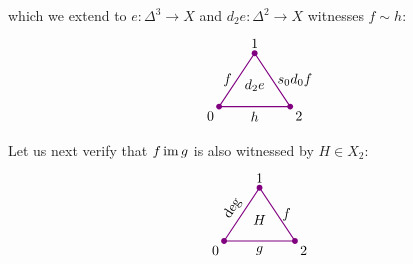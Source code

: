         which we extend to $e \colon \Delta^3 \to X$ and $d_2 e \colon \Delta^2 \to X$ witnesses $f \sim h$:
        \begin{equation*}
            \begin{tikzpicture}[
                scale=0.9, 
                thick, 
                color=violet, 
                every node/.style={text=black},
                dot/.style={circle, fill=violet, inner sep=1.5pt, outer sep=0pt}
            ]

                \coordinate (O) at (0,0);       %
                \coordinate (A) at (1, 1.5);    %
                \coordinate (B) at (2, 0);      %

                \draw (O) -- node[left] {$f$} (A) 
                    -- node[right] {$s_0 d_0 f$} (B) 
                    -- node[below] {$h$} cycle;

                \node[dot] at (O) {};
                \node[dot] at (A) {};
                \node[dot] at (B) {};

                \node[below left] at (O) {0};
                \node[above] at (A) {1};
                \node[below right] at (B) {2};

                \node[scale=1.0] at (1, 0.6) {$d_2 e$};

            \end{tikzpicture}            
        \end{equation*}
        Let us next verify that $f \operatorname{im} g$ is also witnessed by $H \in X_2$:
        \begin{equation*}
            \begin{tikzpicture}[
                scale=0.9, 
                thick, 
                color=violet, 
                every node/.style={text=black},
                dot/.style={circle, fill=violet, inner sep=1.5pt, outer sep=0pt}
            ]

                \coordinate (O) at (0,0);       %
                \coordinate (A) at (1, 1.5);    %
                \coordinate (B) at (2, 0);      %

                \draw (O) -- node[above, sloped] {$\text{deg}$} (A) 
                    -- node[right] {$f$} (B) 
                    -- node[below] {$g$} cycle;

                \node[dot] at (O) {};
                \node[dot] at (A) {};
                \node[dot] at (B) {};

                \node[below left] at (O) {0};
                \node[above] at (A) {1};
                \node[below right] at (B) {2};

                \node[scale=1.0] at (1, 0.6) {$H$};

            \end{tikzpicture}            
        \end{equation*}
